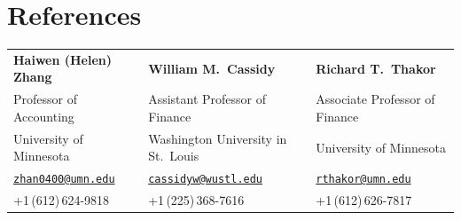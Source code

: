 \documentclass[letterpaper,11pt]{article}
\begin{document}
\section{References}
\begin{tabularx}{\textwidth}{@{}X X X@{}}
  \textbf{Haiwen (Helen) Zhang} & \textbf{William M.\ Cassidy} & \textbf{Richard T.\ Thakor} \\
  Professor of Accounting & Assistant Professor of Finance & Associate Professor of Finance \\
  University of Minnesota & Washington University in St.\ Louis & University of Minnesota \\
  \href{mailto:zhan0400@umn.edu}{\texttt{zhan0400@umn.edu}} &
  \href{mailto:cassidyw@wustl.edu}{\texttt{cassidyw@wustl.edu}} &
  \href{mailto:rthakor@umn.edu}{\texttt{rthakor@umn.edu}} \\
  +1\,(612)\,624-9818 & +1\,(225)\,368-7616 & +1\,(612)\,626-7817 \\
\end{tabularx}
\end{document}

